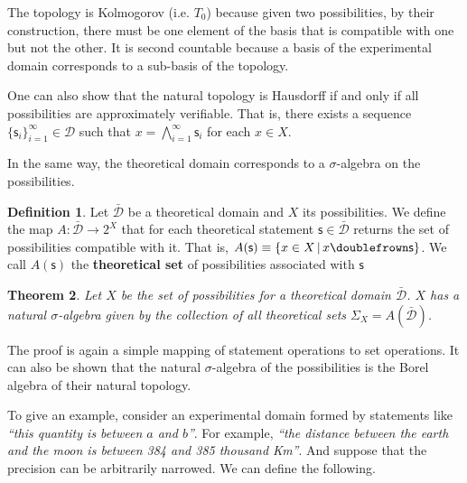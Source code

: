 \documentclass[letterpaper]{article}
\theoremstyle{plain}%
\newtheorem{thrm}{Theorem}[section]
\theoremstyle{definition}
\newtheorem{defn}[thrm]{Definition}
\theoremstyle{remark}
\def\comp{\doublefrown}
\def\bigAND{\bigwedge}
\newcommand{\stmt}[1][s] {\mathsf{#1}}
\newcommand{\obs}[1][s] {\mathsf{#1}}
\newcommand{\edomain}[1][D] {\mathcal{#1}}
\newcommand{\tdomain}[1][D] {\bar{\mathcal{#1}}}
\newcommand{\statement}[1] {\emph{``#1''}}
\begin{document}
The topology is Kolmogorov (i.e. $T_0$) because given two possibilities, by their construction, there must be one element of the basis that is compatible with one but not the other. It is second countable because a basis of the experimental domain corresponds to a sub-basis of the topology.

One can also show that the natural topology is Hausdorff if and only if all possibilities are approximately verifiable. That is, there exists a sequence $\{\obs_i\}_{i=1}^{\infty} \in \edomain$ such that $x = \bigAND\limits_{i=1}^{\infty} \obs_i$ for each $x \in X$.

In the same way, the theoretical domain corresponds to a $\sigma$-algebra on the possibilities.

\begin{defn}
	Let $\tdomain$ be a theoretical domain and $X$ its possibilities. We define the map $A : \tdomain \rightarrow 2^X$ that for each theoretical statement $\stmt \in \tdomain$ returns the set of possibilities compatible with it. That is, $A(\stmt)\equiv\{ x \in X \, | \, x \comp \stmt\}$. We call $A(\stmt)$ the \textbf{theoretical set} of possibilities associated with $\stmt$
\end{defn}

\begin{thrm}
	Let $X$ be the set of possibilities for a theoretical domain $\tdomain$. $X$ has a natural $\sigma$-algebra given by the collection of all theoretical sets $\Sigma_X=A(\tdomain)$.
\end{thrm}

The proof is again a simple mapping of statement operations to set operations. It can also be shown that the natural $\sigma$-algebra of the possibilities is the Borel algebra of their natural topology.

To give an example, consider an experimental domain formed by statements like \statement{this quantity is between $a$ and $b$}. For example, \statement{the distance between the earth and the moon is between 384 and 385 thousand Km}. And suppose that the precision can be arbitrarily narrowed. We can define the following.
\end{document}
